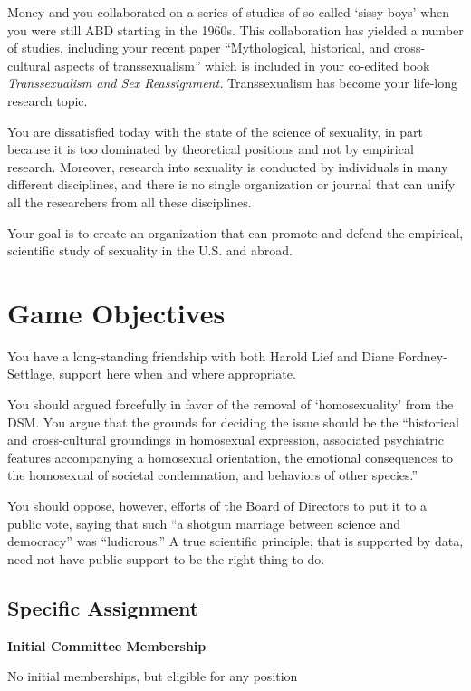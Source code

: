 \begin{refsection}
Money and you collaborated on a series of studies of so-called `sissy boys' when you were still ABD starting in the 1960s. This collaboration has yielded a number of studies, including your recent paper “Mythological, historical, and cross-cultural aspects of transsexualism” which is included in your co-edited book \emph{Transsexualism and Sex Reassignment.} Transsexualism has become your life-long research topic.

You are dissatisfied today with the state of the science of sexuality, in part because it is too dominated by theoretical positions and not by empirical research. Moreover, research into sexuality is conducted by individuals in many different disciplines, and there is no single organization or journal that can unify all the researchers from all these disciplines.

Your goal is to create an organization that can promote and defend the empirical, scientific study of sexuality in the U.S. and abroad.

\section{Game Objectives}
\label{gameobjectives}

You have a long-standing friendship with both Harold Lief and Diane Fordney-Settlage, support here when and where appropriate.

You should argued forcefully in favor of the removal of `homosexuality' from the DSM. You argue that the grounds for deciding the issue should be the ``historical and cross-cultural groundings in homosexual expression, associated psychiatric features accompanying a homosexual orientation, the emotional consequences to the homosexual of societal condemnation, and behaviors of other species.''

You should oppose, however, efforts of the Board of Directors to put it to a public vote, saying that such ``a shotgun marriage between science and democracy'' was ``ludicrous.'' A true scientific principle, that is supported by data, need not have public support to be the right thing to do.

\subsection{Specific Assignment}
\label{specificassignment}

\textbf{Initial Committee Membership}

No initial memberships, but eligible for any position


\end{refsection}
